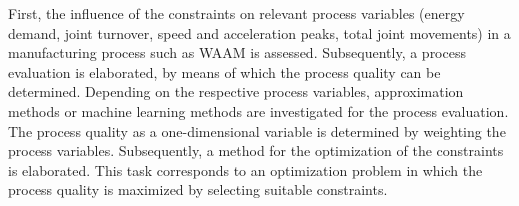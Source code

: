 First, the influence of the constraints on relevant process variables (energy demand, joint turnover, speed and acceleration peaks, total joint movements) in a manufacturing process such as \acrshort{WAAM} is assessed. Subsequently, a process evaluation is elaborated, by means of which the process quality can be determined. Depending on the respective process variables, approximation methods or machine learning methods are investigated for the process evaluation. The process quality as a one-dimensional variable is determined by weighting the process variables. Subsequently, a method for the optimization of the constraints is elaborated. This task corresponds to an optimization problem in which the process quality is maximized by selecting suitable constraints. 
